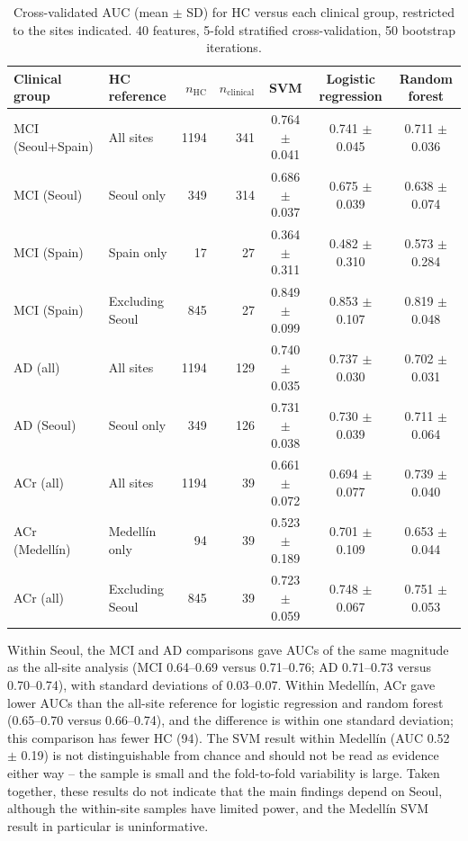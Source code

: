 \documentclass[11pt]{article}
\begin{document}
\begin{table}[ht]
\centering
\caption{Cross-validated AUC (mean $\pm$ SD) for HC versus each clinical group, restricted to the sites indicated. 40 features, 5-fold stratified cross-validation, 50 bootstrap iterations.}
\label{tab:site}
\small
\begin{tabular}{@{}llrrccc@{}}
\toprule
Clinical group & HC reference & $n_\text{HC}$ & $n_\text{clinical}$ & SVM & Logistic regression & Random forest \\
\midrule
MCI (Seoul+Spain) & All sites & 1194 & 341 & 0.764 $\pm$ 0.041 & 0.741 $\pm$ 0.045 & 0.711 $\pm$ 0.036 \\
MCI (Seoul) & Seoul only & 349 & 314 & 0.686 $\pm$ 0.037 & 0.675 $\pm$ 0.039 & 0.638 $\pm$ 0.074 \\
MCI (Spain) & Spain only & 17 & 27 & 0.364 $\pm$ 0.311 & 0.482 $\pm$ 0.310 & 0.573 $\pm$ 0.284 \\
MCI (Spain) & Excluding Seoul & 845 & 27 & 0.849 $\pm$ 0.099 & 0.853 $\pm$ 0.107 & 0.819 $\pm$ 0.048 \\
AD (all) & All sites & 1194 & 129 & 0.740 $\pm$ 0.035 & 0.737 $\pm$ 0.030 & 0.702 $\pm$ 0.031 \\
AD (Seoul) & Seoul only & 349 & 126 & 0.731 $\pm$ 0.038 & 0.730 $\pm$ 0.039 & 0.711 $\pm$ 0.064 \\
ACr (all) & All sites & 1194 & 39 & 0.661 $\pm$ 0.072 & 0.694 $\pm$ 0.077 & 0.739 $\pm$ 0.040 \\
ACr (Medell\'in) & Medell\'in only & 94 & 39 & 0.523 $\pm$ 0.189 & 0.701 $\pm$ 0.109 & 0.653 $\pm$ 0.044 \\
ACr (all) & Excluding Seoul & 845 & 39 & 0.723 $\pm$ 0.059 & 0.748 $\pm$ 0.067 & 0.751 $\pm$ 0.053 \\
\bottomrule
\end{tabular}
\end{table}

Within Seoul, the MCI and AD comparisons gave AUCs of the same magnitude as the all-site analysis (MCI 0.64--0.69 versus 0.71--0.76; AD 0.71--0.73 versus 0.70--0.74), with standard deviations of 0.03--0.07. Within Medell\'in, ACr gave lower AUCs than the all-site reference for logistic regression and random forest (0.65--0.70 versus 0.66--0.74), and the difference is within one standard deviation; this comparison has fewer HC (94). The SVM result within Medell\'in (AUC 0.52 $\pm$ 0.19) is not distinguishable from chance and should not be read as evidence either way -- the sample is small and the fold-to-fold variability is large. Taken together, these results do not indicate that the main findings depend on Seoul, although the within-site samples have limited power, and the Medell\'in SVM result in particular is uninformative.
\end{document}
